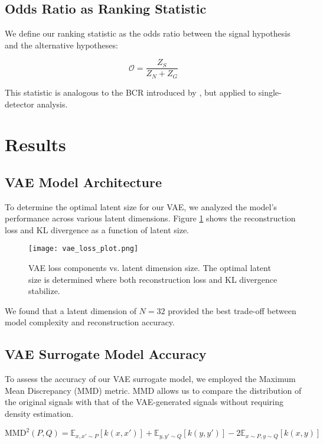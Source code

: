 \documentclass[twocolumn]{aastex631}
\begin{document}
\subsection{Odds Ratio as Ranking Statistic}
We define our ranking statistic as the odds ratio between the signal hypothesis and the alternative hypotheses:

\begin{equation}
\mathcal{O} = \frac{Z_S}{Z_N + Z_G}    
\end{equation}

This statistic is analogous to the BCR introduced by \citet{Isi:2018:PhRvD}, but applied to single-detector analysis.

\section{Results}


\subsection{VAE Model Architecture}
To determine the optimal latent size for our VAE, we analyzed the model's performance across various latent dimensions. 
Figure \ref{fig:vae_loss} shows the reconstruction loss and KL divergence as a function of latent size.

\begin{figure}[h]
    \centering
    \texttt{[image: vae\_loss\_plot.png]}
    \caption{VAE loss components vs. latent dimension size. The optimal latent size is determined where both reconstruction loss and KL divergence stabilize.}
    \label{fig:vae_loss}
\end{figure}

We found that a latent dimension of $N=32$ provided the best trade-off between model complexity and reconstruction accuracy.

\subsection{VAE Surrogate Model Accuracy}
To assess the accuracy of our VAE surrogate model, we employed the Maximum Mean Discrepancy (MMD) metric. 
MMD allows us to compare the distribution of the original signals with that of the VAE-generated signals without requiring density estimation.

\begin{equation}
    \text{MMD}^2(P,Q) = \mathbb{E}_{x,x'\sim P}[k(x,x')] + \mathbb{E}_{y,y'\sim Q}[k(y,y')] - 2\mathbb{E}_{x\sim P,y\sim Q}[k(x,y)]
\end{equation}
\end{document}
